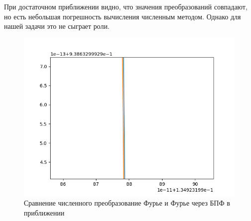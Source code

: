{    При достаточном приближении видно, что значения преобразований совпадают, но есть небольшая погрешность  вычисления численным методом. Однако для нашей задачи это не сыграет роли.
    \begin{figure}[H]
       \centering
            \includegraphics[width=\textwidth,height=\textheight,keepaspectratio]{calc_fft_diff_close.png}
            \caption{Сравнение численного преобразование Фурье и Фурье через БПФ в приближении}
            \label{calc_fft_diff_close}
    \end{figure}
}

\newpage

